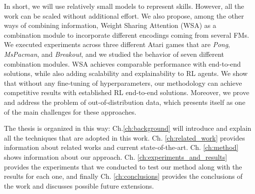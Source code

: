 In short, we will use relatively small models to represent skills.
However, all the work can be scaled without additional effort.
We also propose, among the other ways of combining information, Weight Sharing Attention (WSA) as a combination module to incorporate different encodings coming from several FMs.
We executed experiments across three different Atari games that are \textit{Pong}, \textit{MsPacman}, and \textit{Breakout}, and we studied the behavior of seven different combination modules.
WSA achieves comparable performance with end-to-end solutions, while also adding scalability and explainability to RL agents.
We show that without any fine-tuning of hyperparameters, our methodology can achieve competitive results with established RL end-to-end solutions.
Moreover, we prove and address the problem of out-of-distribution data, which presents itself as one of the main challenges for these approaches.


The thesis is organized in this way: Ch.\ref{ch:background} will introduce and explain all the techniques that are adopted in this work.
Ch. \ref{ch:related_work} provides information about related works and current state-of-the-art.
Ch. \ref{ch:method} shows information about our approach.
Ch. \ref{ch:experiments_and_results} provides the experiments that we conducted to test our method along with the results for each one, and finally Ch. \ref{ch:conclusions} provides the conclusions of the work and discusses possible future extensions.
